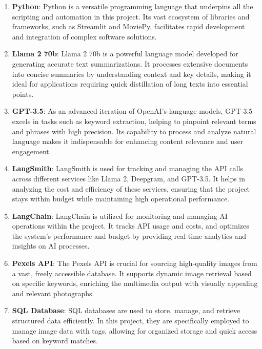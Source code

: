 \documentclass[12pt]{article}
\begin{document}
\begin{enumerate}

    \item \textbf{Python}: Python is a versatile programming language that underpins all the scripting and automation in this project. Its vast ecosystem of libraries and frameworks, such as Streamlit and MoviePy, facilitates rapid development and integration of complex software solutions.

    \item \textbf{Llama 2 70b}: Llama 2 70b is a powerful language model developed for generating accurate text summarizations. It processes extensive documents into concise summaries by understanding context and key details, making it ideal for applications requiring quick distillation of long texts into essential points.

    \item \textbf{GPT-3.5}: As an advanced iteration of OpenAI's language models, GPT-3.5 excels in tasks such as keyword extraction, helping to pinpoint relevant terms and phrases with high precision. Its capability to process and analyze natural language makes it indispensable for enhancing content relevance and user engagement.

    \item \textbf{LangSmith}: LangSmith is used for tracking and managing the API calls across different services like Llama 2, Deepgram, and GPT-3.5. It helps in analyzing the cost and efficiency of these services, ensuring that the project stays within budget while maintaining high operational performance.

    \item \textbf{LangChain}: LangChain is utilized for monitoring and managing AI operations within the project. It tracks API usage and costs, and optimizes the system's performance and budget by providing real-time analytics and insights on AI processes.

    \item \textbf{Pexels API}: The Pexels API is crucial for sourcing high-quality images from a vast, freely accessible database. It supports dynamic image retrieval based on specific keywords, enriching the multimedia output with visually appealing and relevant photographs.

    \item \textbf{SQL Database}: SQL databases are used to store, manage, and retrieve structured data efficiently. In this project, they are specifically employed to manage image data with tags, allowing for organized storage and quick access based on keyword matches.


\end{enumerate}
\end{document}
